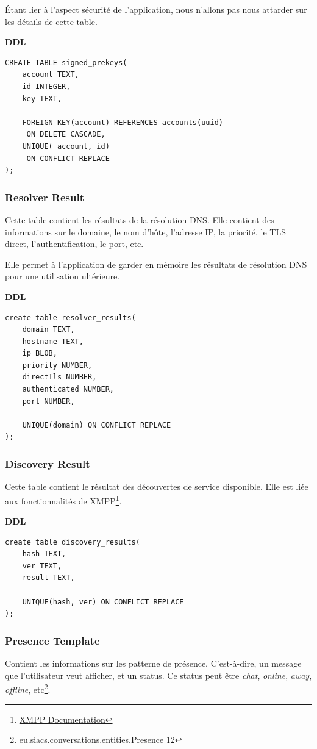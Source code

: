 \documentclass[a4paper,11pt]{article}
\begin{document}
Étant lier à l'aspect sécurité de l'application, nous n'allons pas nous attarder sur les détails de cette table.

\textbf{DDL}
\begin{lstlisting}
CREATE TABLE signed_prekeys(
    account TEXT,
    id INTEGER,
    key TEXT,
    
    FOREIGN KEY(account) REFERENCES accounts(uuid)
     ON DELETE CASCADE,
    UNIQUE( account, id)
     ON CONFLICT REPLACE
);
\end{lstlisting}
\subsubsection{Resolver Result}

Cette table contient les résultats de la résolution DNS. Elle contient des informations sur le domaine, le nom d'hôte, l'adresse IP, la priorité, le TLS direct, l'authentification, le port, etc.

Elle permet à l'application de garder en mémoire les résultats de résolution DNS pour une utilisation ultérieure.

\textbf{DDL}
\begin{lstlisting}
create table resolver_results(
    domain TEXT,
    hostname TEXT,
    ip BLOB,
    priority NUMBER,
    directTls NUMBER,
    authenticated NUMBER,
    port NUMBER,
    
    UNIQUE(domain) ON CONFLICT REPLACE
);
\end{lstlisting}
\subsubsection{Discovery Result}

Cette table contient le résultat des découvertes de service disponible. Elle est liée aux fonctionnalités de XMPP\footnote{\href{https://xmpp.org/extensions/xep-0030.html}{XMPP Documentation}}.

\textbf{DDL}
\begin{lstlisting}
create table discovery_results(
    hash TEXT,
    ver TEXT,
    result TEXT,
    
    UNIQUE(hash, ver) ON CONFLICT REPLACE
);
\end{lstlisting}
\subsubsection{Presence Template}

Contient les informations sur les patterne de présence. C'est-à-dire, un message que l'utilisateur veut afficher, et un status. Ce status peut être \textit{chat}, \textit{online}, \textit{away}, \textit{offline}, etc\footnote{eu.siacs.conversations.entities.Presence 12}.
\end{document}
